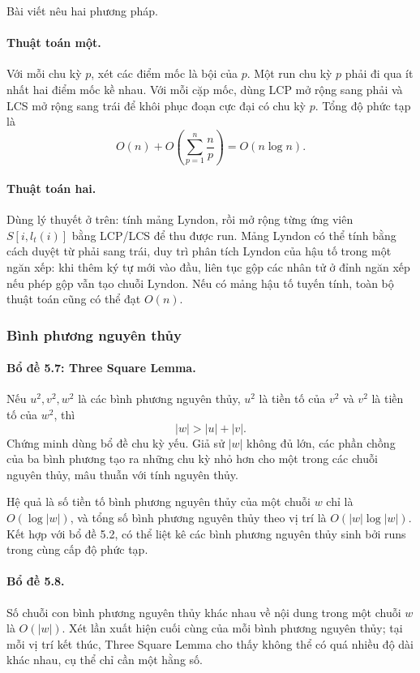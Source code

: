 \documentclass[11pt]{article}
\begin{document}
Bài viết nêu hai phương pháp.

\paragraph{Thuật toán một.}
Với mỗi chu kỳ $p$, xét các điểm mốc là bội của $p$. Một run chu kỳ $p$ phải đi
qua ít nhất hai điểm mốc kề nhau. Với mỗi cặp mốc, dùng LCP mở rộng sang phải
và LCS mở rộng sang trái để khôi phục đoạn cực đại có chu kỳ $p$. Tổng độ phức
tạp là
\[
  O(n)+O\!\left(\sum_{p=1}^n \frac np\right)=O(n\log n).
\]

\paragraph{Thuật toán hai.}
Dùng lý thuyết ở trên: tính mảng Lyndon, rồi mở rộng từng ứng viên
$S[i,l_t(i)]$ bằng LCP/LCS để thu được run. Mảng Lyndon có thể tính bằng cách
duyệt từ phải sang trái, duy trì phân tích Lyndon của hậu tố trong một ngăn xếp:
khi thêm ký tự mới vào đầu, liên tục gộp các nhân tử ở đỉnh ngăn xếp nếu phép
gộp vẫn tạo chuỗi Lyndon. Nếu có mảng hậu tố tuyến tính, toàn bộ thuật toán cũng
có thể đạt $O(n)$.

\subsubsection{Bình phương nguyên thủy}

\paragraph{Bổ đề 5.7: Three Square Lemma.}
Nếu $u^2,v^2,w^2$ là các bình phương nguyên thủy, $u^2$ là tiền tố của $v^2$ và
$v^2$ là tiền tố của $w^2$, thì
\[
  |w|>|u|+|v|.
\]
Chứng minh dùng bổ đề chu kỳ yếu. Giả sử $|w|$ không đủ lớn, các phần chồng của
ba bình phương tạo ra những chu kỳ nhỏ hơn cho một trong các chuỗi nguyên thủy,
mâu thuẫn với tính nguyên thủy.

Hệ quả là số tiền tố bình phương nguyên thủy của một chuỗi $w$ chỉ là
$O(\log |w|)$, và tổng số bình phương nguyên thủy theo vị trí là
$O(|w|\log |w|)$. Kết hợp với bổ đề 5.2, có thể liệt kê các bình phương nguyên
thủy sinh bởi runs trong cùng cấp độ phức tạp.

\paragraph{Bổ đề 5.8.}
Số chuỗi con bình phương nguyên thủy khác nhau về nội dung trong một chuỗi $w$
là $O(|w|)$. Xét lần xuất hiện cuối cùng của mỗi bình phương nguyên thủy; tại
mỗi vị trí kết thúc, Three Square Lemma cho thấy không thể có quá nhiều độ dài
khác nhau, cụ thể chỉ cần một hằng số.
\end{document}
